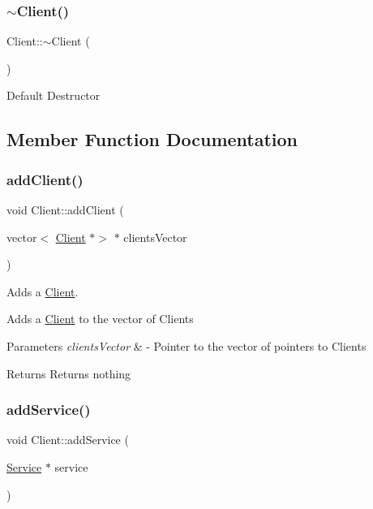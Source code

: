 \subsubsection{\texorpdfstring{$\sim$\+Client()}{~Client()}}
{\footnotesize\ttfamily Client\+::$\sim$\+Client (\begin{DoxyParamCaption}{ }\end{DoxyParamCaption})\hspace{0.3cm}{\ttfamily [virtual]}}

Default Destructor 

\subsection{Member Function Documentation}
\mbox{\label{class_client_acd07078857cade36eee66b733de7bc38}} 
\subsubsection{\texorpdfstring{add\+Client()}{addClient()}}
{\footnotesize\ttfamily void Client\+::add\+Client (\begin{DoxyParamCaption}\item[{vector$<$ \hyperlink{class_client}{Client} $\ast$$>$ $\ast$}]{clients\+Vector }\end{DoxyParamCaption})\hspace{0.3cm}{\ttfamily [static]}}



Adds a \hyperlink{class_client}{Client}. 

Adds a \hyperlink{class_client}{Client} to the vector of Clients


\begin{DoxyParams}{Parameters}
{\em clients\+Vector} & -\/ Pointer to the vector of pointers to Clients \\
\hline
\end{DoxyParams}
\begin{DoxyReturn}{Returns}
Returns nothing 
\end{DoxyReturn}
\mbox{\label{class_client_abf36aa7168464608e917fa40f1ba52db}} 
\subsubsection{\texorpdfstring{add\+Service()}{addService()}}
{\footnotesize\ttfamily void Client\+::add\+Service (\begin{DoxyParamCaption}\item[{\hyperlink{class_service}{Service} $\ast$}]{service }\end{DoxyParamCaption})}




